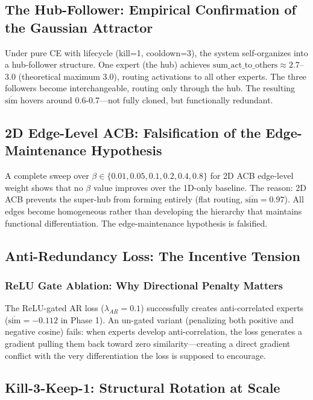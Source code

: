 \documentclass[twoside]{article}
\theoremstyle{definition}
\begin{document}
\subsection{The Hub-Follower: Empirical Confirmation of the Gaussian Attractor}

Under pure CE with lifecycle (kill=1, cooldown=3), the system self-organizes into a hub-follower structure. One expert (the hub) achieves $\text{sum\_act\_to\_others} \approx 2.7$--$3.0$ (theoretical maximum 3.0), routing activations to all other experts. The three followers become interchangeable, routing only through the hub. The resulting $\overline{\text{sim}}$ hovers around 0.6-0.7---not fully cloned, but functionally redundant.

\subsection{2D Edge-Level ACB: Falsification of the Edge-Maintenance Hypothesis}

A complete sweep over $\beta \in \{0.01, 0.05, 0.1, 0.2, 0.4, 0.8\}$ for 2D ACB edge-level weight shows that no $\beta$ value improves over the 1D-only baseline. The reason: 2D ACB prevents the super-hub from forming entirely (flat routing, $\overline{\text{sim}}=0.97$). All edges become homogeneous rather than developing the hierarchy that maintains functional differentiation. The edge-maintenance hypothesis is falsified.

\subsection{Anti-Redundancy Loss: The Incentive Tension}

\subsubsection{ReLU Gate Ablation: Why Directional Penalty Matters}

The ReLU-gated AR loss ($\lambda_{AR}=0.1$) successfully creates anti-correlated experts ($\overline{\text{sim}}=-0.112$ in Phase 1). An un-gated variant (penalizing both positive and negative cosine) fails: when experts develop anti-correlation, the loss generates a gradient pulling them back toward zero similarity---creating a direct gradient conflict with the very differentiation the loss is supposed to encourage.

\subsection{Kill-3-Keep-1: Structural Rotation at Scale}
\end{document}
